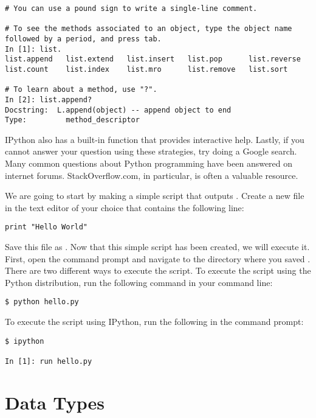 \begin{lstlisting}
# You can use a pound sign to write a single-line comment.

# To see the methods associated to an object, type the object name followed by a period, and press tab.
In [1]: list.
list.append   list.extend   list.insert   list.pop      list.reverse  
list.count    list.index    list.mro      list.remove   list.sort

# To learn about a method, use "?".
In [2]: list.append?
Docstring:  L.append(object) -- append object to end
Type:         method_descriptor
\end{lstlisting}

IPython also has a built-in function  that provides interactive help.  Lastly, if you cannot answer your question using these strategies, try doing a Google search.  Many common questions about Python programming have been answered on internet forums.  StackOverflow.com, in particular, is often a valuable resource.

\begin{problem}
We are going to start by making a simple script that outputs .  Create a new file in the text editor of your choice that contains the following line:
\begin{lstlisting}
print "Hello World"
\end{lstlisting}
Save this file as . Now that this simple script has been created, we will execute it. First, open the command prompt and navigate to the directory where you saved . There are two different ways to execute the  script. To execute the script using the Python distribution, run the following command in your command line:
\begin{lstlisting}
$ python hello.py
\end{lstlisting}
To execute the script using IPython, run the following in the command prompt:
\begin{lstlisting}
$ ipython

In [1]: run hello.py
\end{lstlisting}
\end{problem}

\section*{Data Types}


